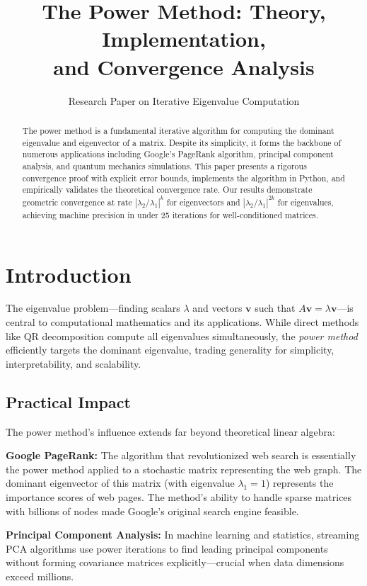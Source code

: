 \documentclass[11pt,a4paper]{article}
\title{\textbf{The Power Method: Theory, Implementation,\\and Convergence Analysis}}
\author{Research Paper on Iterative Eigenvalue Computation}
\date{}
\begin{document}
\maketitle

\begin{abstract}
The power method is a fundamental iterative algorithm for computing the dominant eigenvalue and eigenvector of a matrix. Despite its simplicity, it forms the backbone of numerous applications including Google's PageRank algorithm, principal component analysis, and quantum mechanics simulations. This paper presents a rigorous convergence proof with explicit error bounds, implements the algorithm in Python, and empirically validates the theoretical convergence rate. Our results demonstrate geometric convergence at rate $|\lambda_2/\lambda_1|^k$ for eigenvectors and $|\lambda_2/\lambda_1|^{2k}$ for eigenvalues, achieving machine precision in under 25 iterations for well-conditioned matrices.
\end{abstract}

\section{Introduction}

The eigenvalue problem—finding scalars $\lambda$ and vectors $\mathbf{v}$ such that $A\mathbf{v} = \lambda\mathbf{v}$—is central to computational mathematics and its applications. While direct methods like QR decomposition compute all eigenvalues simultaneously, the \emph{power method} efficiently targets the dominant eigenvalue, trading generality for simplicity, interpretability, and scalability.

\subsection{Practical Impact}

The power method's influence extends far beyond theoretical linear algebra:

\textbf{Google PageRank:} The algorithm that revolutionized web search is essentially the power method applied to a stochastic matrix representing the web graph. The dominant eigenvector of this matrix (with eigenvalue $\lambda_1 = 1$) represents the importance scores of web pages. The method's ability to handle sparse matrices with billions of nodes made Google's original search engine feasible.

\textbf{Principal Component Analysis:} In machine learning and statistics, streaming PCA algorithms use power iterations to find leading principal components without forming covariance matrices explicitly—crucial when data dimensions exceed millions.
\end{document}
